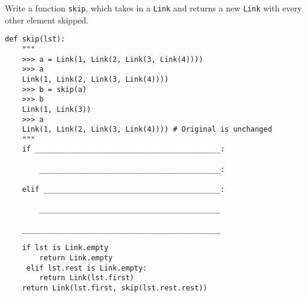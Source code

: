 \begin{blocksection}
\question Write a function \texttt{skip}, which takes in a \texttt{Link} and returns a new \texttt{Link} with every other element skipped.

\begin{lstlisting}
def skip(lst):
    """
    >>> a = Link(1, Link(2, Link(3, Link(4))))
    >>> a
    Link(1, Link(2, Link(3, Link(4))))
    >>> b = skip(a)
    >>> b
    Link(1, Link(3))
    >>> a
    Link(1, Link(2, Link(3, Link(4)))) # Original is unchanged
    """
    if ___________________________________________:
		
        __________________________________________:
				
    elif _________________________________________:
		
        __________________________________________
				
    ______________________________________________
\end{lstlisting}
\begin{solution}[0.6in]
\begin{lstlisting}
    if lst is Link.empty 
    	return Link.empty
     elif lst.rest is Link.empty:
        return Link(lst.first)
    return Link(lst.first, skip(lst.rest.rest))
\end{lstlisting}
\end{solution}
\end{blocksection}

